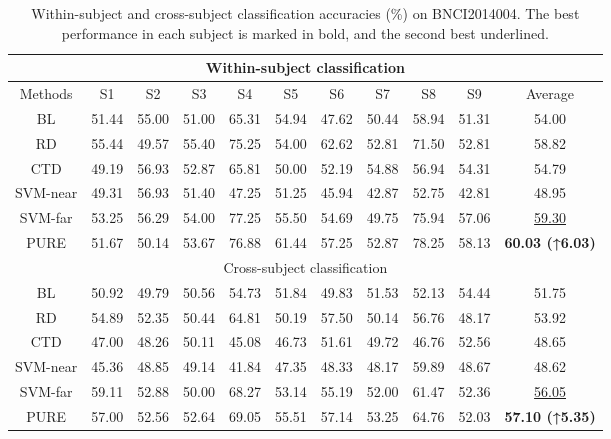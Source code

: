 \documentclass[journal,twocolumn]{IEEEtran}
\begin{document}
\begin{table}[htpb] \centering
  \caption{Within-subject and cross-subject classification accuracies (\%) on BNCI2014004. The best performance in each subject is marked in bold, and the second best underlined.}
  \label{tab:2014004-result}
  \begin{tabular}{c|c|c|c|c|c|c|c|c|c|c}
  \toprule
  \multicolumn{11}{c}{Within-subject classification} \\
  \midrule
  Methods & S1 & S2 & S3 & S4 & S5 & S6 & S7 & S8 & S9 & Average \\
  \midrule
  BL & 51.44 & 55.00 & 51.00 & 65.31 & 54.94 & 47.62 & 50.44 & 58.94 & 51.31 & 54.00 \\
  RD & 55.44 & 49.57 & 55.40 & 75.25 & 54.00 & 62.62 & 52.81 & 71.50 & 52.81 & 58.82 \\
  CTD & 49.19 & 56.93 & 52.87 & 65.81 & 50.00 & 52.19 & 54.88 & 56.94 & 54.31 & 54.79 \\
  SVM-near & 49.31 & 56.93 & 51.40 & 47.25 & 51.25 & 45.94 & 42.87 & 52.75 & 42.81 & 48.95 \\
  SVM-far & 53.25 & 56.29 & 54.00 & 77.25 & 55.50 & 54.69 & 49.75 & 75.94 & 57.06 & \underline{59.30} \\
  PURE & 51.67 & 50.14 & 53.67 & 76.88 & 61.44 & 57.25 & 52.87 & 78.25 & 58.13 & \textbf{60.03 (↑6.03)} \\
  \midrule
  \multicolumn{11}{c}{Cross-subject classification} \\
  \midrule
  BL & 50.92 & 49.79 & 50.56 & 54.73 & 51.84 & 49.83 & 51.53 & 52.13 & 54.44 & 51.75 \\
  RD & 54.89 & 52.35 & 50.44 & 64.81 & 50.19 & 57.50 & 50.14 & 56.76 & 48.17 & 53.92 \\
  CTD & 47.00 & 48.26 & 50.11 & 45.08 & 46.73 & 51.61 & 49.72 & 46.76 & 52.56 & 48.65 \\
  SVM-near & 45.36 & 48.85 & 49.14 & 41.84 & 47.35 & 48.33 & 48.17 & 59.89 & 48.67 & 48.62 \\
  SVM-far & 59.11 & 52.88 & 50.00 & 68.27 & 53.14 & 55.19 & 52.00 & 61.47 & 52.36 & \underline{56.05} \\
  PURE & 57.00 & 52.56 & 52.64 & 69.05 & 55.51 & 57.14 & 53.25 & 64.76 & 52.03 & \textbf{57.10 (↑5.35)} \\
  \bottomrule
  \end{tabular}
\end{table}
\end{document}
